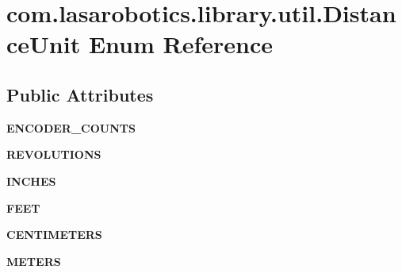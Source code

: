 \hypertarget{enumcom_1_1lasarobotics_1_1library_1_1util_1_1_distance_unit}{}\section{com.\+lasarobotics.\+library.\+util.\+Distance\+Unit Enum Reference}
\label{enumcom_1_1lasarobotics_1_1library_1_1util_1_1_distance_unit}
\subsection*{Public Attributes}
\begin{DoxyCompactItemize}
\item 
\hypertarget{enumcom_1_1lasarobotics_1_1library_1_1util_1_1_distance_unit_a9844972e9598e6e0dc61cdb08079efab}{}{\bfseries E\+N\+C\+O\+D\+E\+R\+\_\+\+C\+O\+U\+N\+T\+S}\label{enumcom_1_1lasarobotics_1_1library_1_1util_1_1_distance_unit_a9844972e9598e6e0dc61cdb08079efab}

\item 
\hypertarget{enumcom_1_1lasarobotics_1_1library_1_1util_1_1_distance_unit_a4888d574907c8c2407c603876dd0736d}{}{\bfseries R\+E\+V\+O\+L\+U\+T\+I\+O\+N\+S}\label{enumcom_1_1lasarobotics_1_1library_1_1util_1_1_distance_unit_a4888d574907c8c2407c603876dd0736d}

\item 
\hypertarget{enumcom_1_1lasarobotics_1_1library_1_1util_1_1_distance_unit_ab53eeec0a6c6824ab88dc8c365403611}{}{\bfseries I\+N\+C\+H\+E\+S}\label{enumcom_1_1lasarobotics_1_1library_1_1util_1_1_distance_unit_ab53eeec0a6c6824ab88dc8c365403611}

\item 
\hypertarget{enumcom_1_1lasarobotics_1_1library_1_1util_1_1_distance_unit_aa28f41b9a0bd7c0470172fa148f68f5b}{}{\bfseries F\+E\+E\+T}\label{enumcom_1_1lasarobotics_1_1library_1_1util_1_1_distance_unit_aa28f41b9a0bd7c0470172fa148f68f5b}

\item 
\hypertarget{enumcom_1_1lasarobotics_1_1library_1_1util_1_1_distance_unit_a4d3792effda3125a8679aeb3ff83b398}{}{\bfseries C\+E\+N\+T\+I\+M\+E\+T\+E\+R\+S}\label{enumcom_1_1lasarobotics_1_1library_1_1util_1_1_distance_unit_a4d3792effda3125a8679aeb3ff83b398}

\item 
\hypertarget{enumcom_1_1lasarobotics_1_1library_1_1util_1_1_distance_unit_a9bf95fbd40b0075f8e069dba946d713b}{}{\bfseries M\+E\+T\+E\+R\+S}\label{enumcom_1_1lasarobotics_1_1library_1_1util_1_1_distance_unit_a9bf95fbd40b0075f8e069dba946d713b}

\end{DoxyCompactItemize}


